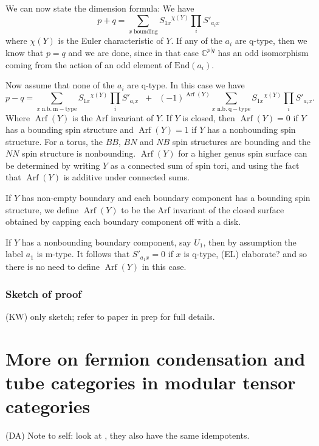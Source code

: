 \documentclass[12pt,a4paper]{article}
\newcommand{\cc}{\mathbb{C}}
\newcommand\be            {\begin{equation}}
\newcommand\ee            {\end{equation}}
\newcommand{\End}{\text{End}}
\DeclareMathOperator{\Arf}{Arf}
\newcommand{\kw}[1]{{\color{kwcolor}\footnotesize{(KW) #1}}}
\newcommand{\dave}[1]{{\color{ao(english)}\footnotesize{(DA) #1}}}
\newcommand{\ethan}[1]{{\color{amethyst}\footnotesize{(EL) #1}}}
\begin{document}
We can now state the dimension formula:
We have
\be
	p + q = \sum_{x\;  \mathrm{bounding}} {S_{1x}}^{\chi(Y)} {\textstyle \prod_i} S'_{a_i x} 
	\label{PplusQ}
\ee
where $\chi(Y)$ is the Euler characteristic of $Y$.
If any of the $a_i$ are q-type, then we know that $p=q$ and we are done, since in that case 
$\cc^{p|q}$ has an odd isomorphism coming from the action of an odd element of $\End(a_i)$.

Now assume that none of the $a_i$ are q-type.
In this case we have
\be
	p - q = \sum_{x\;  \mathrm{n.b.\ m-type}} {S_{1x}}^{\chi(Y)} {\textstyle \prod_i} S'_{a_i x}
			\;\;+\;\; (-1)^{\Arf(Y)} \sum_{x\;  \mathrm{n.b.\ q-type}} {S_{1x}}^{\chi(Y)} {\textstyle \prod_i} S'_{a_i x} .
			\label{PminusQ}
\ee
Where $\Arf(Y)$ is the Arf invariant of $Y$.
If $Y$ is closed, then $\Arf(Y) = 0$ if $Y$ has a bounding spin structure and 
$\Arf(Y) = 1$ if $Y$ has a nonbounding spin structure.
For a torus, the $BB$, $BN$ and $NB$ spin structures are bounding and the $NN$ spin structure is nonbounding.
$\Arf(Y)$ for a higher genus spin surface can be determined by writing $Y$ as a connected sum of spin tori,
and using the fact that $\Arf(Y)$ is additive under connected sums.

If $Y$ has non-empty boundary and each boundary component has a bounding spin structure, 
we define $\Arf(Y)$ to be the Arf invariant of the closed 
surface obtained by capping each boundary component off with a disk.

If $Y$ has a nonbounding boundary component, say $U_1$, then by assumption
the label $a_1$ is m-type.
It follows that $S'_{a_1 x} = 0$ if $x$ is q-type, \ethan{elaborate?} 
and so there is no need to define $\Arf(Y)$ in this case.




\subsubsection{Sketch of proof}


\kw{only sketch; refer to paper in prep for full details.}




\section{More on fermion condensation and tube categories in modular tensor categories} \label{more_on_tubes}

\dave{Note to self: look at \cite{Koenig2010}, they also have the same idempotents.}
\end{document}
